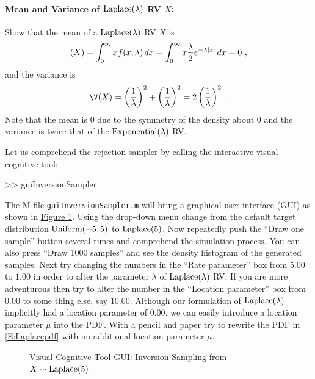 \paragraph{Mean and Variance of $\mbox{{\rm Laplace}}(\lambda)$ RV $X$:}
Show that the mean of a $\mbox{{\rm Laplace}}(\lambda)$ RV $X$ is
\[
\mathscr{(}X) = \int_{0}^{\infty} x f(x;\lambda)\,dx
=   \int_{0}^{\infty} x \frac{\lambda}{2} e^{- \lambda |x|}\,dx
= 0 \ ,
\]
and the variance is
\[
\V(X) = \left(  \frac{1}{\lambda} \right)^2 + \left(  \frac{1}{\lambda} \right)^2 = 2 \left(  \frac{1}{\lambda} \right)^2\ .
\]
Note that the mean is $0$ due to the symmetry of the density about $0$ and the variance is twice that of the $\mbox{{\rm Exponential}}(\lambda)$ RV.

\begin{labwork}\label{LW:guiInversionSamplerLaplace}
Let us comprehend the rejection sampler by calling the interactive visual cognitive tool:
\begin{VrbM}
>> guiInversionSampler
\end{VrbM}
The M-file {\tt guiInversionSampler.m} will bring a graphical user interface (GUI) as shown in \hyperref[F:guiInversionSamplerLaplace]{Figure \ref*{F:guiInversionSamplerLaplace}}.  Using the drop-down menu change from the default target distribution $\mbox{{\rm Uniform}}(-5,5)$ to $\mbox{{\rm Laplace}}(5)$.  Now repeatedly push the ``Draw one sample'' button several times and comprehend the simulation process.  You can also press ``Draw 1000 samples'' and see the density histogram of the generated samples.  
Next try changing the numbers in the ``Rate parameter'' box from $5.00$ to $1.00$ in order to alter the parameter $\lambda$ of $\mbox{{\rm Laplace}}(\lambda)$ RV.  If you are more adventurous then try to alter the number in the ``Location parameter'' box from $0.00$ to some thing else, say $10.00$.  Although our formulation of $\mbox{{\rm Laplace}}(\lambda)$ implicitly had a location parameter of $0.00$, we can easily introduce a location parameter $\mu$ into the PDF.  With a pencil and paper try to rewrite the PDF in \eqref{E:Laplacepdf} with an additional location parameter $\mu$.
\end{labwork}

\begin{figure}[htpb]
\caption{Visual Cognitive Tool GUI: Inversion Sampling from $X \sim \mbox{{\rm Laplace}}(5)$.\label{F:guiInversionSamplerLaplace}}
\centering   {}
\end{figure}

